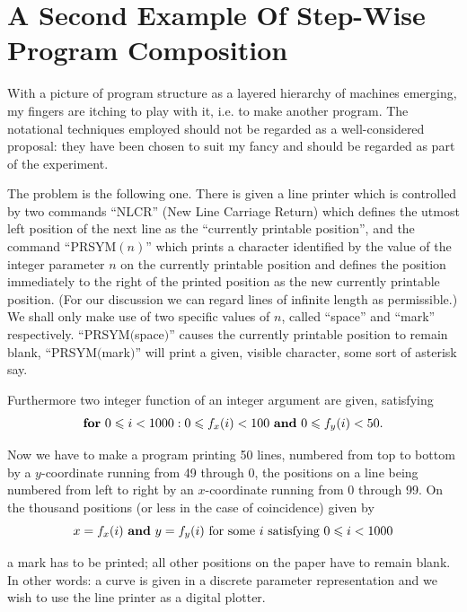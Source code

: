 \documentclass[twoside,11pt]{book}
\begin{document}
\section[A second example of step-wise program composition]{A Second Example Of Step-Wise Program Composition}

With a picture of program structure as a layered hierarchy of machines emerging, my fingers are itching to play with it, i.e. to make another program. The notational techniques employed should not be regarded as a well-considered proposal: they have been chosen to suit my fancy and should be regarded as part of the experiment.

The problem is the following one. There is given a line printer which is controlled by two commands ``NLCR'' (New Line Carriage Return) which defines the utmost left position of the next line as the ``currently printable position'', and the command ``PRSYM$(n)$'' which prints a character identified by the value of the integer parameter $n$ on the currently printable position and defines the position immediately to the right of the printed position as the new currently printable position. (For our discussion we can regard lines of infinite length as permissible.) We shall only make use of two specific values of $n$, called ``space'' and ``mark'' respectively. ``PRSYM$($space$)$'' causes the currently printable position to remain blank, ``PRSYM$($mark$)$'' will print a given, visible character, some sort of asterisk say.

Furthermore two integer function of an integer argument are given, satisfying
$$
\text{\textbf{for} } 0 \leqslant i < 1000 : 0 \leqslant f_x(i) < 100 \text{ \textbf{and} } 0 \leqslant f_y(i) < 50.
$$

Now we have to make a program printing 50 lines, numbered from top to bottom by a $y$-coordinate running from 49 through 0, the positions on a line being numbered from left to right by an $x$-coordinate running from 0 through 99. On the thousand positions (or less in the case of coincidence) given by
$$
x = f_x(i) \text{ \textbf{and} } y = f_y(i) \text{ for some } i \text{ satisfying } 0 \leqslant i < 1000
$$

\noindent
a mark has to be printed; all other positions on the paper have to remain blank. In other words: a curve is given in a discrete parameter representation and we wish to use the line printer as a digital plotter.
\end{document}
